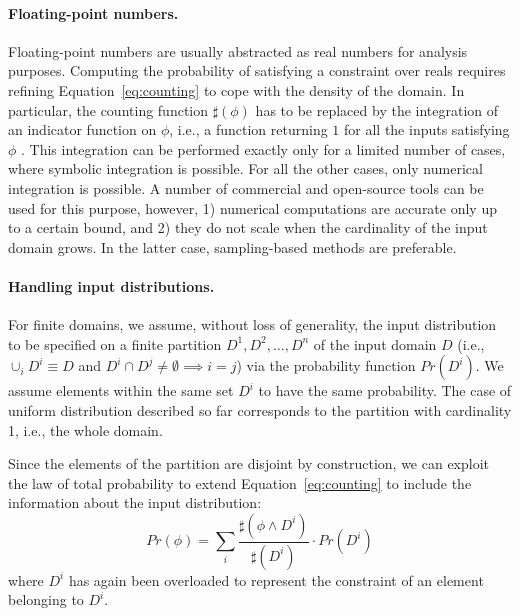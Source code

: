 \begin{itemize}

\end{itemize}


\paragraph{Floating-point numbers.} 
Floating-point numbers are usually abstracted as real numbers for analysis purposes. Computing the probability of satisfying a constraint over reals requires refining Equation~\ref{eq:counting} to cope with the density of the domain. In particular, the counting function $\sharp(\phi)$ has to be replaced by the integration of an indicator function on $\phi$, i.e., a function returning $1$ for all the inputs satisfying $\phi$ \cite{Borges2014}. This integration can be performed exactly only for a limited number of cases, where symbolic integration is possible. For all the other cases, only numerical integration is possible. A number of commercial and open-source tools can be used for this purpose, however, 1) numerical computations are accurate only up to a certain bound, and 2) they do not scale when the cardinality of the input domain grows. In the latter case, sampling-based methods are preferable. 

\paragraph{Handling input distributions.} 
For finite domains, we assume, without loss of generality, the input distribution to be specified on a finite partition $D^1, D^2, \dots, D^n$ of the input domain $D$ (i.e., $\cup_i D^i \equiv D$ and $D^i \cap D^j \neq \emptyset \implies i=j$) via the probability function $Pr(D^i)$. We assume elements within the same set $D^i$ to have the same probability. The case of uniform distribution described so far corresponds to the partition with cardinality 1, i.e., the whole domain.
 
Since the elements of the partition are disjoint by construction, we can exploit the law of total probability to extend Equation~\eqref{eq:counting} to include the information about the input distribution:
%
\begin{equation}\label{eq:countingInputDistribution}
	Pr(\phi) = \sum_i \frac{\sharp(\phi \land D^i)}{\sharp(D^i)} \cdot Pr(D^i)
\end{equation}
%
\noindent where $D^i$ has again been overloaded to represent the constraint of an element belonging to $D^i$.

